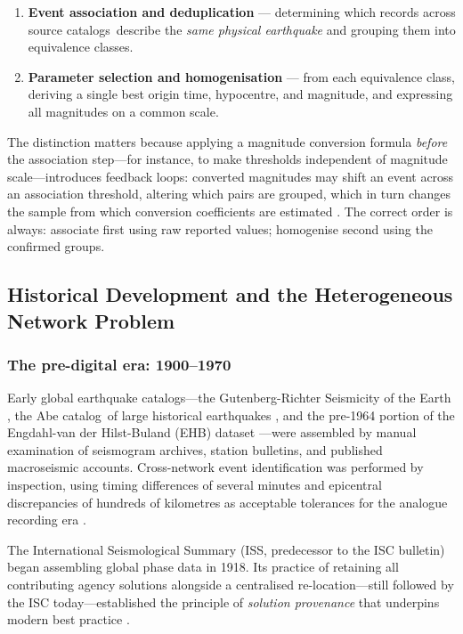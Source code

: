 \documentclass[12pt]{article}
\newcommand{\catalog}{catalog}
\newcommand{\catalogs}{catalogs}
\begin{document}
\begin{enumerate}
  \item \textbf{Event association and deduplication} — determining which records
        across source \catalogs\ describe the \emph{same physical earthquake}
        and grouping them into equivalence classes.

  \item \textbf{Parameter selection and homogenisation} — from each equivalence
        class, deriving a single best origin time, hypocentre, and magnitude,
        and expressing all magnitudes on a common scale.
\end{enumerate}

The distinction matters because applying a magnitude conversion formula
\emph{before} the association step---for instance, to make thresholds
independent of magnitude scale---introduces feedback loops: converted magnitudes may
shift an event across an association threshold, altering which pairs are grouped,
which in turn changes the sample from which conversion coefficients are estimated
\citep{Storchak2013, Grunthal2016}.  The correct order is always: associate
first using raw reported values; homogenise second using the confirmed groups.

\subsection{Historical Development and the Heterogeneous Network Problem}
\label{sec:history}

\subsubsection{The pre-digital era: 1900–1970}

Early global earthquake \catalogs—the Gutenberg-Richter Seismicity of the Earth
\citep{GutenbergRichter1954}, the Abe \catalog\ of large historical earthquakes
\citep{Abe1981}, and the pre-1964 portion of the Engdahl-van der Hilst-Buland
(EHB) dataset \citep{Engdahl1998}—were assembled by manual examination of
seismogram archives, station bulletins, and published macroseismic accounts.
Cross-network event identification was performed by inspection, using timing
differences of several minutes and epicentral discrepancies of hundreds of
kilometres as acceptable tolerances for the analogue recording era
\citep{Bondar2011}.

The International Seismological Summary (ISS, predecessor to the ISC bulletin)
began assembling global phase data in 1918.  Its practice of retaining all
contributing agency solutions alongside a centralised re-location—still followed
by the ISC today—established the principle of \emph{solution provenance} that
underpins modern best practice \citep{ISCBulletinRebuild2020}.
\end{document}
